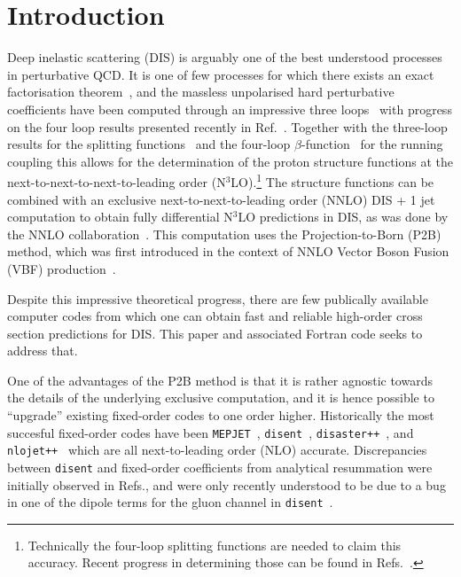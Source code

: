 \documentclass[submission, PhysCodeb]{SciPost}
\newcommand{\disent}{{\tt disent}}
\newcommand{\nnlojet}{NNLO{\sc{jet}}}
\newcommand{\disaster}{{\tt disaster++}}
\newcommand{\nlojet}{{\tt nlojet++}}
\newcommand{\NNNLO}{N$^3$LO}
\begin{document}
\section{Introduction}
\label{sec:intro}
Deep inelastic scattering (DIS) is arguably one of the best understood
processes in perturbative QCD. It is one of few processes for which
there exists an exact factorisation
theorem~\cite{Collins:1987pm,Collins:1989gx}, and the massless
unpolarised hard perturbative coefficients have been computed through
an impressive three
loops~\cite{SanchezGuillen:1990iq,vanNeerven:1991nn,Zijlstra:1992qd,Zijlstra:1992kj,vanNeerven:1999ca,vanNeerven:2000uj,Moch:1999eb,Moch:2004xu,Vermaseren:2005qc,Vogt:2006bt,Moch:2007rq,Davies:2016ruz,Blumlein:2022gpp}
with progress on the four loop results presented recently in
Ref.~\cite{Moch:2022frw}. Together with the three-loop results for the
splitting functions~\cite{Moch:2004pa,Vogt:2004mw} and the four-loop
$\beta$-function~\cite{vanRitbergen:1997va,Czakon:2004bu} for the
running coupling this allows for the determination of the proton
structure functions at the next-to-next-to-next-to-leading order
(\NNNLO{}).\footnote{Technically the four-loop splitting functions are
needed to claim this accuracy. Recent progress in determining those
can be found in
Refs.~\cite{Moch:2021qrk,Falcioni:2023luc,Falcioni:2023vqq,Gehrmann:2023cqm,Falcioni:2023tzp,Moch:2023tdj,Gehrmann:2023iah}.}
The structure functions can be combined with an exclusive
next-to-next-to-leading order (NNLO) DIS + 1 jet computation to obtain
fully differential \NNNLO{} predictions in DIS, as was done by the \nnlojet{}
collaboration~\cite{Currie:2018fgr,Gehrmann:2018odt}. This computation
uses the Projection-to-Born (P2B) method, which was first introduced
in the context of NNLO Vector Boson Fusion (VBF)
production~\cite{Cacciari:2015jma}.

Despite this impressive theoretical progress, there are few publically
available computer codes from which one can obtain fast and reliable
high-order cross section predictions for DIS. This paper and
associated Fortran code seeks to address that.

One of the advantages of the P2B method is that it is rather agnostic
towards the details of the underlying exclusive computation, and it is
hence possible to ``upgrade'' existing fixed-order codes to one order
higher. Historically the most succesful fixed-order codes have been
{\tt MEPJET}~\cite{Mirkes:1995ks}, \disent{}~\cite{Catani:1996vz},
\disaster{}~\cite{Graudenz:1997gv}, and \nlojet{}~\cite{Nagy:2001xb}
which are all next-to-leading order (NLO) accurate. Discrepancies
between \disent{} and fixed-order coefficients from analytical
resummation were initially observed in
Refs.\cite{Antonelli:1999kx,Dasgupta:2002dc}, and were only recently
understood to be due to a bug in one of the dipole terms for the gluon
channel in \disent{}~\cite{Borsa:2020ulb,Borsa:2020yxh}.
\end{document}
